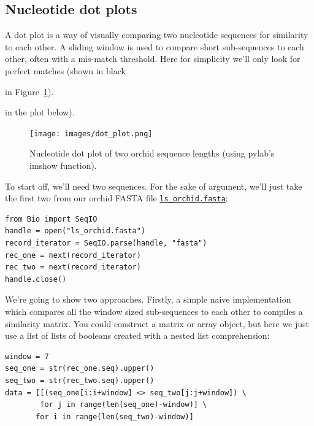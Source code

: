 \documentclass{report}
\begin{document}
\subsection{Nucleotide dot plots}
A dot plot is a way of visually comparing two nucleotide sequences for similarity to
each other.  A sliding window is used to compare short sub-sequences to each other,
often with a mis-match threshold.  Here for simplicity we'll only look for perfect
matches (shown in black
\begin{latexonly}
in Figure~\ref{fig:nuc-dot-plot}).
\end{latexonly}
\begin{htmlonly}
in the plot below).
\end{htmlonly}

%
%
\begin{latexonly}
\begin{figure}[htbp]
\centering
\texttt{[image: images/dot\_plot.png]}
\caption{Nucleotide dot plot of two orchid sequence lengths (using pylab's imshow function).}
\label{fig:nuc-dot-plot}
\end{figure}
\end{latexonly}

To start off, we'll need two sequences.  For the sake of argument, we'll just take
the first two from our orchid FASTA file \href{http://biopython.org/DIST/docs/tutorial/examples/ls_orchid.fasta}{\tt ls\_orchid.fasta}:

\begin{verbatim}
from Bio import SeqIO
handle = open("ls_orchid.fasta")
record_iterator = SeqIO.parse(handle, "fasta")
rec_one = next(record_iterator)
rec_two = next(record_iterator)
handle.close()
\end{verbatim}

We're going to show two approaches.  Firstly, a simple naive implementation
which compares all the window sized sub-sequences to each other to compiles a
similarity matrix.  You could construct a matrix or array object, but here we
just use a list of lists of booleans created with a nested list
comprehension:

\begin{verbatim}
window = 7
seq_one = str(rec_one.seq).upper()
seq_two = str(rec_two.seq).upper()
data = [[(seq_one[i:i+window] <> seq_two[j:j+window]) \
        for j in range(len(seq_one)-window)] \
       for i in range(len(seq_two)-window)]
\end{verbatim}
\end{document}
